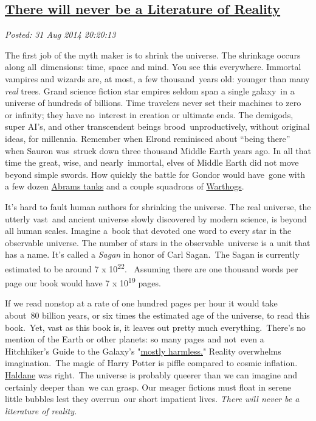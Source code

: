 %

\subsection*{\href{http://bakerjd99.wordpress.com/2014/08/31/there-will-never-be-a-literature-of-reality/}{There will never be a Literature of Reality}}


\noindent\emph{Posted: 31 Aug 2014 20:20:13}
\vspace{6pt}

The first job of the myth maker is to shrink the universe. The shrinkage
occurs along all~dimensions: time, space and mind. You see this
everywhere. Immortal vampires and wizards are, at most, a few
thousand~years old: younger than many \emph{real} trees. Grand science
fiction star empires seldom span a single galaxy~in a universe of
hundreds of billions. Time travelers never set their machines to zero or
infinity; they have no~interest in creation or ultimate ends. The
demigods, super AI's, and other transcendent beings
brood~unproductively, without original ideas, for millennia. Remember
when Elrond reminisced about ``being there'' when Sauron was~struck down
three thousand Middle Earth years ago. In all that time the great, wise,
and nearly~immortal, elves of Middle Earth did not move beyond simple
swords. How quickly the battle for Gondor would have~gone with a few
dozen
\href{http://www.marines.com/operating-forces/equipment/vehicles/m1a1-abrams-tank}{Abrams
tanks} and a couple squadrons of
\href{http://en.wikipedia.org/wiki/Fairchild_Republic_A-10_Thunderbolt_II}{Warthogs}.

It's hard to fault human authors for shrinking the universe. The real
universe, the utterly vast~and ancient universe slowly discovered by
modern science, is beyond all human scales. Imagine a~book that devoted
one word to every star in the observable universe. The number of stars
in the observable~universe is a unit that has a name. It's called a
\emph{Sagan} in honor of Carl Sagan.~The Sagan is currently estimated to
be around 7 x 10\textsuperscript{22}. ~Assuming there are one thousand
words per page our book would have 7 x 10\textsuperscript{19} pages.

If we read nonstop at a rate of one hundred pages per hour it would take
about~80 billion years, or six times the estimated age of the universe,
to read this book.~Yet, vast as this book is, it leaves out pretty much
everything.~There's no mention of the Earth or other planets: so many
pages and not~even a Hitchhiker's Guide to the Galaxy's
"\href{http://en.wikipedia.org/wiki/Mostly_Harmless}{mostly harmless.}"
Reality overwhelms imagination.~The magic of Harry Potter is piffle
compared to cosmic inflation.
\href{http://en.wikiquote.org/wiki/J._B._S._Haldane}{Haldane} was
right.~The universe is probably queerer than we can imagine and
certainly deeper than~we can grasp. Our meager fictions must float in
serene little bubbles lest they overrun~our short impatient lives.
\emph{There will never be a literature of reality.}



%